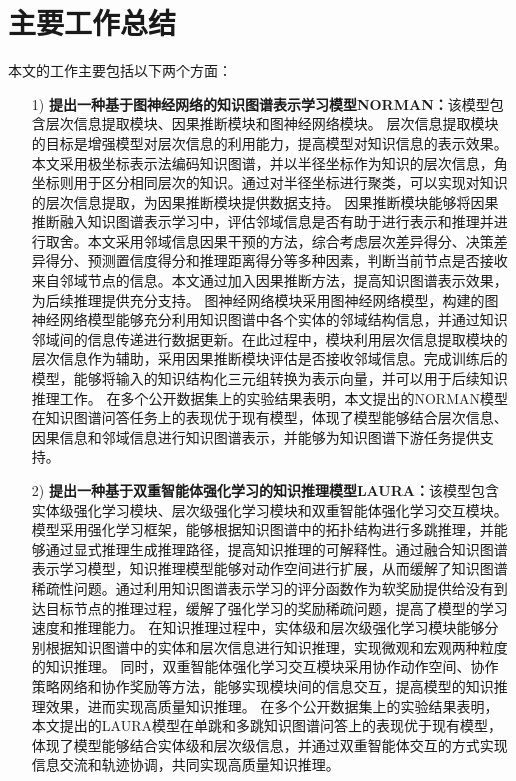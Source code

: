 \documentclass[algorithmlist, AutoFakeBold, AutoFakeSlant, figurelist, tablelist, nomlist, engineering]{seuthesix}
\begin{document}
\section{主要工作总结}
本文的工作主要包括以下两个方面：
\begin{itemize}
  \item [1)]\textbf{提出一种基于图神经网络的知识图谱表示学习模型NORMAN：}该模型包含层次信息提取模块、因果推断模块和图神经网络模块。
  层次信息提取模块的目标是增强模型对层次信息的利用能力，提高模型对知识信息的表示效果。本文采用极坐标表示法编码知识图谱，并以半径坐标作为知识的层次信息，角坐标则用于区分相同层次的知识。通过对半径坐标进行聚类，可以实现对知识的层次信息提取，为因果推断模块提供数据支持。
  因果推断模块能够将因果推断融入知识图谱表示学习中，评估邻域信息是否有助于进行表示和推理并进行取舍。本文采用邻域信息因果干预的方法，综合考虑层次差异得分、决策差异得分、预测置信度得分和推理距离得分等多种因素，判断当前节点是否接收来自邻域节点的信息。本文通过加入因果推断方法，提高知识图谱表示效果，为后续推理提供充分支持。
  图神经网络模块采用图神经网络模型，构建的图神经网络模型能够充分利用知识图谱中各个实体的邻域结构信息，并通过知识邻域间的信息传递进行数据更新。在此过程中，模块利用层次信息提取模块的层次信息作为辅助，采用因果推断模块评估是否接收邻域信息。完成训练后的模型，能够将输入的知识结构化三元组转换为表示向量，并可以用于后续知识推理工作。
  在多个公开数据集上的实验结果表明，本文提出的NORMAN模型在知识图谱问答任务上的表现优于现有模型，体现了模型能够结合层次信息、因果信息和邻域信息进行知识图谱表示，并能够为知识图谱下游任务提供支持。
  \item [2)]\textbf{提出一种基于双重智能体强化学习的知识推理模型LAURA：}该模型包含实体级强化学习模块、层次级强化学习模块和双重智能体强化学习交互模块。
  模型采用强化学习框架，能够根据知识图谱中的拓扑结构进行多跳推理，并能够通过显式推理生成推理路径，提高知识推理的可解释性。通过融合知识图谱表示学习模型，知识推理模型能够对动作空间进行扩展，从而缓解了知识图谱稀疏性问题。通过利用知识图谱表示学习的评分函数作为软奖励提供给没有到达目标节点的推理过程，缓解了强化学习的奖励稀疏问题，提高了模型的学习速度和推理能力。
  在知识推理过程中，实体级和层次级强化学习模块能够分别根据知识图谱中的实体和层次信息进行知识推理，实现微观和宏观两种粒度的知识推理。
  同时，双重智能体强化学习交互模块采用协作动作空间、协作策略网络和协作奖励等方法，能够实现模块间的信息交互，提高模型的知识推理效果，进而实现高质量知识推理。
  在多个公开数据集上的实验结果表明，本文提出的LAURA模型在单跳和多跳知识图谱问答上的表现优于现有模型，体现了模型能够结合实体级和层次级信息，并通过双重智能体交互的方式实现信息交流和轨迹协调，共同实现高质量知识推理。
\end{itemize}
\end{document}
